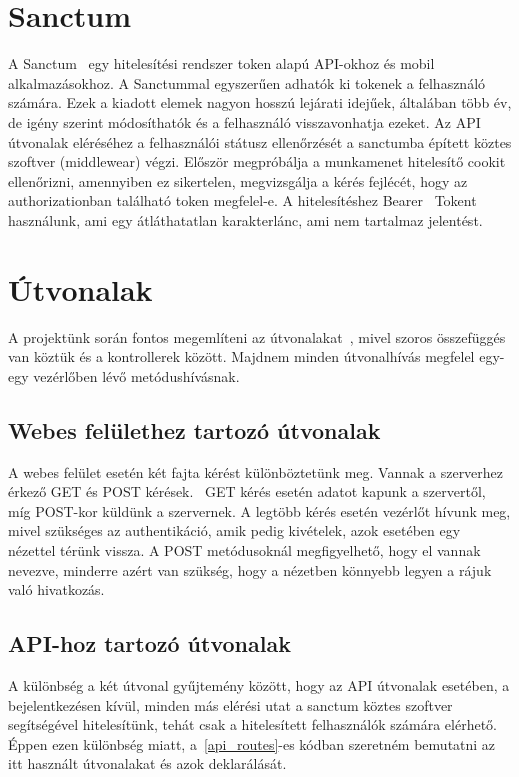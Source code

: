 \documentclass[
]{thesis-ekf}
\theoremstyle{definition}
\theoremstyle{remark}
\begin{document}
	\section{Sanctum}
	A Sanctum~\cite{laravel_sanctum} egy hitelesítési rendszer token alapú API-okhoz és mobil alkalmazásokhoz. A Sanctummal egyszerűen adhatók ki tokenek a felhasználó számára. Ezek a kiadott elemek nagyon hosszú lejárati idejűek, általában több év, de igény szerint módosíthatók és a felhasználó visszavonhatja ezeket. Az API útvonalak eléréséhez a felhasználói státusz ellenőrzését a sanctumba épített köztes szoftver (middlewear) végzi. Először megpróbálja a munkamenet hitelesítő cookit ellenőrizni, amennyiben ez sikertelen, megvizsgálja a kérés fejlécét, hogy az authorizationban található token megfelel-e. A hitelesítéshez Bearer~\cite{bearer_token} Tokent használunk, ami egy átláthatatlan karakterlánc, ami nem tartalmaz jelentést.
	
	\section{Útvonalak}
	A projektünk során fontos megemlíteni az útvonalakat~\cite{laravel_route}, mivel szoros összefüggés van köztük és a kontrollerek között. Majdnem minden útvonalhívás megfelel egy-egy vezérlőben lévő metódushívásnak. 
	
	\subsection{Webes felülethez tartozó útvonalak}
	A webes felület esetén két fajta kérést különböztetünk meg. Vannak a szerverhez érkező GET és POST kérések.~\cite{get_post_difference} GET kérés esetén adatot kapunk a szervertől, míg POST-kor küldünk a szervernek. A legtöbb kérés esetén vezérlőt hívunk meg, mivel szükséges az authentikáció, amik pedig kivételek, azok esetében egy nézettel térünk vissza. A POST metódusoknál megfigyelhető, hogy el vannak nevezve, minderre azért van szükség, hogy a nézetben könnyebb legyen a rájuk való hivatkozás. 
	
	\subsection{API-hoz tartozó útvonalak}
	A különbség a két útvonal gyűjtemény között, hogy az API útvonalak esetében, a bejelentkezésen kívül, minden más elérési utat a sanctum köztes szoftver segítségével hitelesítünk, tehát csak a hitelesített felhasználók számára elérhető. Éppen ezen különbség miatt, a~\ref{api_routes}-es kódban szeretném bemutatni az itt használt útvonalakat és azok deklarálását.
	
\end{document}
